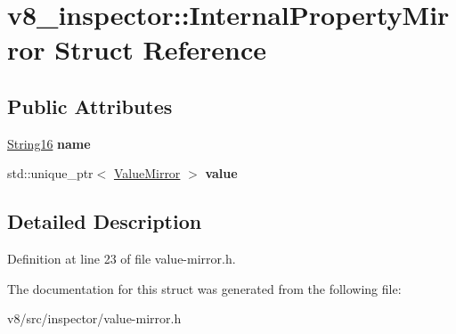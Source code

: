 \hypertarget{structv8__inspector_1_1InternalPropertyMirror}{}\section{v8\+\_\+inspector\+:\+:Internal\+Property\+Mirror Struct Reference}
\label{structv8__inspector_1_1InternalPropertyMirror}
\subsection*{Public Attributes}
\begin{DoxyCompactItemize}
\item 
\mbox{\label{structv8__inspector_1_1InternalPropertyMirror_a34df720f313267add6a47f77eac3edeb}} 
\mbox{\hyperlink{classv8__inspector_1_1String16}{String16}} {\bfseries name}
\item 
\mbox{\label{structv8__inspector_1_1InternalPropertyMirror_a4ac28c847a0e90768dcf1af8100695a9}} 
std\+::unique\+\_\+ptr$<$ \mbox{\hyperlink{classv8__inspector_1_1ValueMirror}{Value\+Mirror}} $>$ {\bfseries value}
\end{DoxyCompactItemize}


\subsection{Detailed Description}


Definition at line 23 of file value-\/mirror.\+h.



The documentation for this struct was generated from the following file\+:\begin{DoxyCompactItemize}
\item 
v8/src/inspector/value-\/mirror.\+h\end{DoxyCompactItemize}
